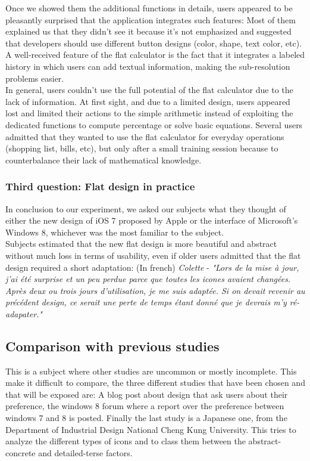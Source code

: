 \documentclass[a4paper,11pt] {article}
\theoremstyle{definition}
\begin{document}
    Once we showed them the additional functions in details, users appeared to be pleasantly surprised that the application integrates such features: Most of them explained us that they didn't see it because it's not emphasized and suggested that developers should use different button designs (color, shape, text color, etc). A well-received feature of the flat calculator is the fact that it integrates a labeled history in which users can add textual information, making the sub-resolution problems easier.\\

    In general, users couldn't use the full potential of the flat calculator due to the lack of information. At first sight, and due to a limited design, users appeared lost and limited their actions to the simple arithmetic instead of exploiting the dedicated functions to compute percentage or solve basic equations. Several users admitted that they wanted to use the flat calculator for everyday operations (shopping list, bills, etc), but only after a small training session because to counterbalance their lack of mathematical knowledge.\\

    \subsubsection{Third question: Flat design in practice}
    In conclusion to our experiment, we asked our subjects what they thought of either the new design of iOS 7 proposed by Apple or the interface of Microsoft's Windows 8, whichever was the most familiar to the subject.\\

    Subjects estimated that the new flat design is more beautiful and abstract without much loss in terms of usability, even if older users admitted that the flat design required a short adaptation:
  	(In french) \textit{Colette} - \textit{"Lors de la mise à jour, j'ai été surprise et un peu perdue parce que toutes les icones avaient changées. Après deux ou trois jours d'utilisation, je me suis adaptée. Si on devait revenir au précédent design, ce serait une perte de temps étant donné que je devrais m'y ré-adapater."}

    \subsection{Comparison with previous studies}
    This is a subject where other studies are uncommon or mostly incomplete. This make it difficult to compare, the three different studies that have been chosen and that will be exposed are: A blog post about design that ask users about their preference, the windows 8 forum where a report over the preference between windows 7 and 8 is posted. Finally the last study is a Japanese one, from the Department of Industrial Design National Cheng Kung University. This tries to analyze the different types of icons and to class them between the abstract-concrete and detailed-terse factors.
\end{document}
